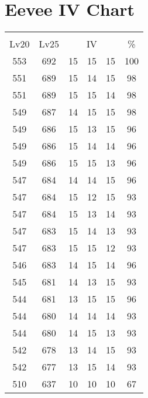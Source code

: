 \documentclass{article}%
\begin{document}
%
\normalsize%
\section{Eevee IV Chart}%
\label{sec:Eevee IV Chart}%
\renewcommand{\arraystretch}{1.5}%
\begin{tabular}{|c|c|c|c|c|c|}%
\hline%
\multicolumn{6}{|c|}{\textcolor{white}{ 
\linebreak{Eevee}
}%
\cellcolor{black}}\\%
\multicolumn{1}{|c}{Lv20}&\multicolumn{1}{c|}{Lv25}&\multicolumn{3}{c|}{IV}&\multicolumn{1}{|c|}{\%}\\%
\hline%
\rowcolor{color100}%
553&692&15&15&15&100\\%
\hline%
\rowcolor{color98}%
551&689&15&14&15&98\\%
\hline%
\rowcolor{color98}%
551&689&15&15&14&98\\%
\hline%
\rowcolor{color98}%
549&687&14&15&15&98\\%
\hline%
\rowcolor{color96}%
549&686&15&13&15&96\\%
\hline%
\rowcolor{color96}%
549&686&15&14&14&96\\%
\hline%
\rowcolor{color96}%
549&686&15&15&13&96\\%
\hline%
\rowcolor{color96}%
547&684&14&14&15&96\\%
\hline%
\rowcolor{color93}%
547&684&15&12&15&93\\%
\hline%
\rowcolor{color93}%
547&684&15&13&14&93\\%
\hline%
\rowcolor{color93}%
547&683&15&14&13&93\\%
\hline%
\rowcolor{color93}%
547&683&15&15&12&93\\%
\hline%
\rowcolor{color96}%
546&683&14&15&14&96\\%
\hline%
\rowcolor{color93}%
545&681&14&13&15&93\\%
\hline%
\rowcolor{color96}%
544&681&13&15&15&96\\%
\hline%
\rowcolor{color93}%
544&680&14&14&14&93\\%
\hline%
\rowcolor{color93}%
544&680&14&15&13&93\\%
\hline%
\rowcolor{color93}%
542&678&13&14&15&93\\%
\hline%
\rowcolor{color93}%
542&677&13&15&14&93\\%
\hline%
\rowcolor{color91}%
510&637&10&10&10&67\\%
\end{tabular}

%
\end{document}
